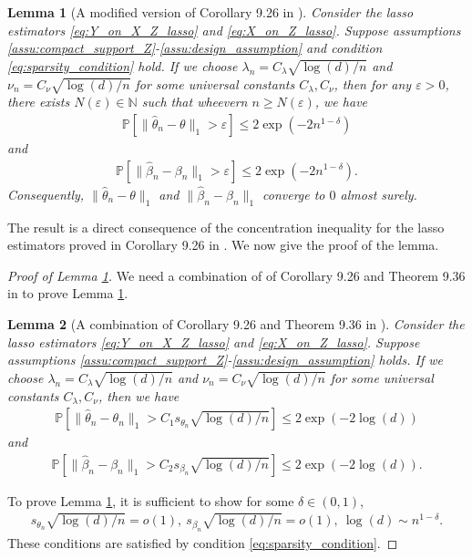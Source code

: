 \documentclass[12pt]{article}
\newtheorem{lemma}{Lemma}
\theoremstyle{definition}
\def\P{\mathbb{P}}
\def\P{\mathbb{P}}
\renewcommand{\P}{\mathbb{P}}							%
\begin{document}
  \begin{lemma}[A modified version of Corollary 9.26 in \citep{wainwright2019high}]\label{lem:oracle_inequality_lasso}
    Consider the lasso estimators \eqref{eq:Y_on_X_Z_lasso} and \eqref{eq:X_on_Z_lasso}. Suppose assumptions \ref{assu:compact_support_Z}-\ref{assu:design_assumption} and condition \eqref{eq:sparsity_condition} hold. If we choose $\lambda_n=C_{\lambda} \sqrt{\log(d)/n}$ and $\nu_n=C_{\nu}\sqrt{\log(d)/n}$ for some universal constants $C_\lambda,C_\nu$, then for any $\varepsilon>0$, there exists $N(\varepsilon)\in\mathbb{N}$ such that wheevern $n\geq N(\varepsilon)$, we have 
    \begin{align*}
      \P[\|\widehat{\theta}_n-\theta\|_1>\varepsilon]\leq 2\exp(-2n^{1-\delta})
    \end{align*}
    and 
    \begin{align*}
      \P[\|\widehat{\beta}_n-\beta_n\|_1>\varepsilon]\leq 2\exp(-2n^{1-\delta}).
    \end{align*}
    Consequently, $\|\widehat{\theta}_n-\theta\|_1$ and $\|\widehat{\beta}_n-\beta_n\|_1$ converge to $0$ almost surely.
  \end{lemma}
  
  \noindent The result is a direct consequence of the concentration inequality for the lasso estimators proved in Corollary 9.26 in \citep{wainwright2019high}. We now give the proof of the lemma.
  \begin{proof}[Proof of Lemma \ref{lem:oracle_inequality_lasso}]
    We need a combination of of Corollary 9.26 and Theorem 9.36 in \citep{wainwright2019high} to prove Lemma \ref{lem:oracle_inequality_lasso}. 
    \begin{lemma}[A combination of Corollary 9.26 and Theorem 9.36 in \citep{wainwright2019high}]\label{lem:exponential_decay_lasso}
      Consider the lasso estimators \eqref{eq:Y_on_X_Z_lasso} and \eqref{eq:X_on_Z_lasso}. Suppose assumptions \ref{assu:compact_support_Z}-\ref{assu:design_assumption} holds. If we choose $\lambda_n=C_{\lambda} \sqrt{\log(d)/n}$ and $\nu_n=C_{\nu}\sqrt{\log(d)/n}$ for some universal constants $C_\lambda,C_\nu$, then we have 
      \begin{align*}
        \P[\|\widehat{\theta}_n-\theta_n\|_1>C_{1}s_{\theta_n}\sqrt{\log(d)/n}]\leq 2\exp(-2\log(d))
      \end{align*}
      and 
      \begin{align*}
        \P[\|\widehat{\beta}_n-\beta_n\|_1>C_{2}s_{\beta_n}\sqrt{\log(d)/n}]\leq 2\exp(-2\log(d)).
      \end{align*}
    \end{lemma}
    \noindent To prove Lemma \ref{lem:oracle_inequality_lasso}, it is sufficient to show for some $\delta\in (0,1)$,
    \begin{align*}
      s_{\theta_n}\sqrt{\log(d)/n}=o(1),\ s_{\beta_n}\sqrt{\log(d)/n}=o(1),\ \log(d)\sim n^{1-\delta}.
    \end{align*}
    These conditions are satisfied by condition \eqref{eq:sparsity_condition}.
  \end{proof}
\end{document}
